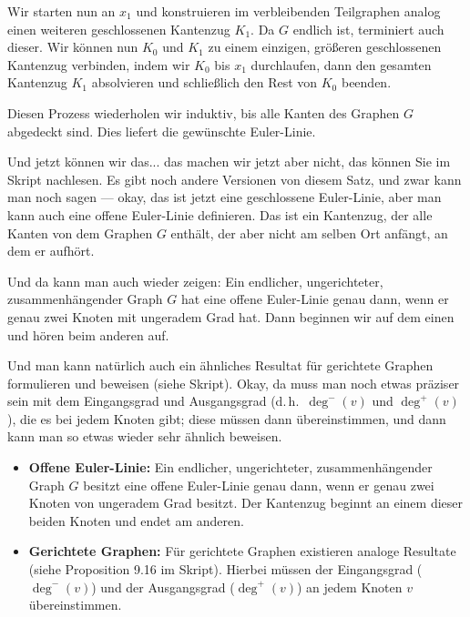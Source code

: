 \begin{math-stroke}
\begin{short-proof}
Wir starten nun an $x_1$ und konstruieren im verbleibenden Teilgraphen analog einen weiteren geschlossenen Kantenzug $K_1$. Da $G$ endlich ist, terminiert auch dieser. Wir können nun $K_0$ und $K_1$ zu einem einzigen, größeren geschlossenen Kantenzug verbinden, indem wir $K_0$ bis $x_1$ durchlaufen, dann den gesamten Kantenzug $K_1$ absolvieren und schließlich den Rest von $K_0$ beenden.
\par\vspace{1ex}\noindent
Diesen Prozess wiederholen wir induktiv, bis alle Kanten des Graphen $G$ abgedeckt sind. Dies liefert die gewünschte Euler-Linie.
\end{short-proof}
\end{math-stroke}

\begin{spoken-clean}[00:15:10 - 00:17:28]
Und jetzt können wir das... das machen wir jetzt aber nicht, das können Sie im Skript nachlesen. Es gibt noch andere Versionen von diesem Satz, und zwar kann man noch sagen --- okay, das ist jetzt eine geschlossene Euler-Linie, aber man kann auch eine offene Euler-Linie definieren. Das ist ein Kantenzug, der alle Kanten von dem Graphen $G$ enthält, der aber nicht am selben Ort anfängt, an dem er aufhört. 

Und da kann man auch wieder zeigen: Ein endlicher, ungerichteter, zusammenhängender Graph $G$ hat eine offene Euler-Linie genau dann, wenn er genau zwei Knoten mit ungeradem Grad hat. Dann beginnen wir auf dem einen und hören beim anderen auf. 

Und man kann natürlich auch ein ähnliches Resultat für gerichtete Graphen formulieren und beweisen (siehe Skript). Okay, da muss man noch etwas präziser sein mit dem Eingangsgrad und Ausgangsgrad (d.\,h.\ $\deg^-(v)$ und $\deg^+(v)$), die es bei jedem Knoten gibt; diese müssen dann übereinstimmen, und dann kann man so etwas wieder sehr ähnlich beweisen.
\end{spoken-clean}

\begin{math-stroke}
\begin{remark}
\begin{itemize}
    \item \textbf{Offene Euler-Linie:} Ein endlicher, ungerichteter, zusammenhängender Graph $G$ besitzt eine offene Euler-Linie genau dann, wenn er genau zwei Knoten von ungeradem Grad besitzt. Der Kantenzug beginnt an einem dieser beiden Knoten und endet am anderen.
    \item \textbf{Gerichtete Graphen:} Für gerichtete Graphen existieren analoge Resultate (siehe Proposition 9.16 im Skript). Hierbei müssen der Eingangsgrad ($\deg^-(v)$) und der Ausgangsgrad ($\deg^+(v)$) an jedem Knoten $v$ übereinstimmen.
\end{itemize}
\end{remark}
\end{math-stroke}

